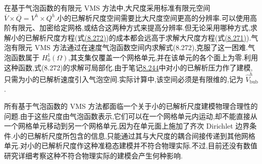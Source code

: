 \begin{note}[用气泡函数局部化小的已解析速度尺度方程]
\label{note:vms-bubble-localization}
在基于气泡函数的有限元 VMS 方法中,大尺度采用标准有限元空间 $\overline V\times\overline Q=V^h\times Q^h$.小的已解析尺度空间需要比大尺度空间更高的分辨率.可以使用高阶有限元、加密给定网格,或结合这两种方式来提高分辨率.但无论采用哪种方式,求解小的已解析尺度方程(式\hyperref[eq:vms-bubble-small-scale-splitting]{(8.272)})的成本都会远高于求解大尺度方程(式\hyperref[eq:vms-bubble-large-scale-splitting]{(8.271)}).气泡有限元 VMS 方法通过在速度气泡函数空间内求解式(8.272),克服了这一困难.气泡函数属于 $H_0^1(\Omega)$,其支集仅覆盖一个网格单元,并在该单元的各个面上为零.利用这种函数,式(8.272)的求解可局部化.由于笔记\hyperref[note:vms-bubble-pressure-model]{8.244}中对小的已解析压力作了建模,只需为小的已解析速度引入气泡空间.实际计算中,该空间必须是有限维的,记为 $\widehat V^h_{\mathrm{bub}}$.
\end{note}

\begin{note}[用气泡函数模拟小的已解析尺度会引入不符合物理实际的性质]
\label{note:vms-bubble-unphysical-property}
所有基于气泡函数的 VMS 方法都面临一个关于小的已解析尺度建模物理合理性的问题.由于这些尺度由气泡函数表示,它们可以在一个网格单元内运动,却不能直接从一个网格单元移动到另一个网格单元,因为在单元面上施加了齐次 Dirichlet 边界条件.小的已解析尺度所包含的信息,只能通过其与大尺度的耦合间接传递到其他网格单元.对小的已解析尺度作这种准稳态建模并不符合物理实际.不过,目前还没有数值研究详细考察这种不符合物理实际的建模会产生何种影响.
\end{note}

